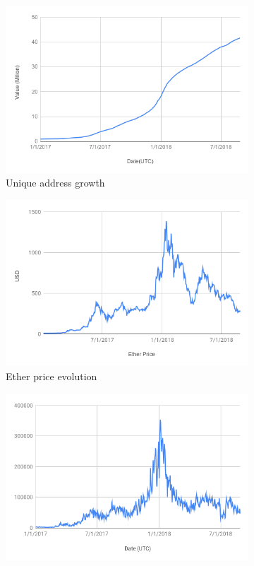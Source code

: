 \begin{figure}
    \begin{subfigure}[b]{0.5\textwidth}
        \includegraphics[width=\textwidth]{./res/img/address-growth.png}
        \caption{Unique address growth}
        \label{fig:address-chart}
    \end{subfigure}
    \begin{subfigure}[b]{0.5\textwidth}
        \includegraphics[width=\textwidth]{./res/img/chart_price.png}
        \caption{Ether price evolution}
        \label{fig:price-chart}
    \end{subfigure}
    \begin{subfigure}[b]{0.5\textwidth}
        \includegraphics[width=\textwidth]{./res/img/address-growth-rate.png}

\end{subfigure}
\end{figure}
